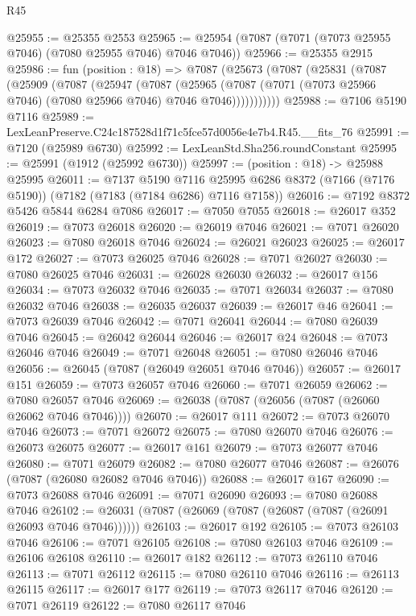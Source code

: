 \begin{lexlean}{R45}
\begin{coremodule}
{@25955 := @25355 @2553
@25965 := @25954 (@7087 (@7071 (@7073 @25955 @7046) (@7080 @25955 @7046) @7046 @7046))
@25966 := @25355 @2915
@25986 := fun (position : @18) =>
  @7087
    (@25673
      (@7087
        (@25831
          (@7087
            (@25909
              (@7087
                (@25947
                  (@7087
                    (@25965
                      (@7087 (@7071 (@7073 @25966 @7046) (@7080 @25966 @7046) @7046 @7046)))))))))))
@25988 := @7106 @5190 @7116
@25989 := LexLeanPreserve.C24c187528d1f71c5fce57d0056e4e7b4.R45.__fits_76
@25991 := @7120 (@25989 @6730)
@25992 := LexLeanStd.Sha256.roundConstant
@25995 := @25991 (@1912 (@25992 @6730))
@25997 := (position : @18) -> @25988 @25995
@26011 := @7137
    @5190
    @7116
    @25995
    @6286
    @8372
    (@7166 (@7176 @5190))
    (@7182 (@7183 (@7184 @6286) @7116 @7158))
@26016 := @7192 @8372 @5426 @5844 @6284 @7086
@26017 := @7050 @7055
@26018 := @26017 @352
@26019 := @7073 @26018
@26020 := @26019 @7046
@26021 := @7071 @26020
@26023 := @7080 @26018 @7046
@26024 := @26021 @26023
@26025 := @26017 @172
@26027 := @7073 @26025 @7046
@26028 := @7071 @26027
@26030 := @7080 @26025 @7046
@26031 := @26028 @26030
@26032 := @26017 @156
@26034 := @7073 @26032 @7046
@26035 := @7071 @26034
@26037 := @7080 @26032 @7046
@26038 := @26035 @26037
@26039 := @26017 @46
@26041 := @7073 @26039 @7046
@26042 := @7071 @26041
@26044 := @7080 @26039 @7046
@26045 := @26042 @26044
@26046 := @26017 @24
@26048 := @7073 @26046 @7046
@26049 := @7071 @26048
@26051 := @7080 @26046 @7046
@26056 := @26045 (@7087 (@26049 @26051 @7046 @7046))
@26057 := @26017 @151
@26059 := @7073 @26057 @7046
@26060 := @7071 @26059
@26062 := @7080 @26057 @7046
@26069 := @26038 (@7087 (@26056 (@7087 (@26060 @26062 @7046 @7046))))
@26070 := @26017 @111
@26072 := @7073 @26070 @7046
@26073 := @7071 @26072
@26075 := @7080 @26070 @7046
@26076 := @26073 @26075
@26077 := @26017 @161
@26079 := @7073 @26077 @7046
@26080 := @7071 @26079
@26082 := @7080 @26077 @7046
@26087 := @26076 (@7087 (@26080 @26082 @7046 @7046))
@26088 := @26017 @167
@26090 := @7073 @26088 @7046
@26091 := @7071 @26090
@26093 := @7080 @26088 @7046
@26102 := @26031 (@7087 (@26069 (@7087 (@26087 (@7087 (@26091 @26093 @7046 @7046))))))
@26103 := @26017 @192
@26105 := @7073 @26103 @7046
@26106 := @7071 @26105
@26108 := @7080 @26103 @7046
@26109 := @26106 @26108
@26110 := @26017 @182
@26112 := @7073 @26110 @7046
@26113 := @7071 @26112
@26115 := @7080 @26110 @7046
@26116 := @26113 @26115
@26117 := @26017 @177
@26119 := @7073 @26117 @7046
@26120 := @7071 @26119
@26122 := @7080 @26117 @7046
}
\end{coremodule}
\end{lexlean}
